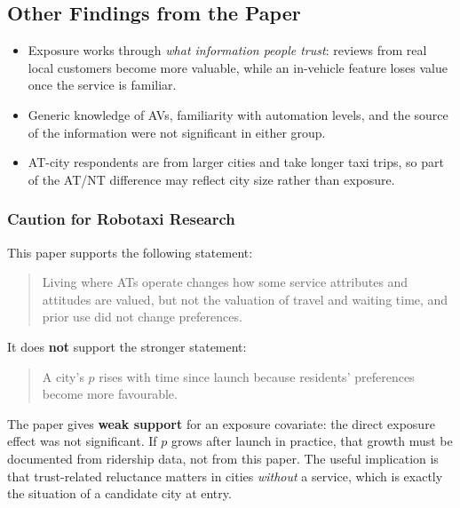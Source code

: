 \documentclass[10pt,a4paper]{article}
\providecommand{\tightlist}{\setlength{\itemsep}{0pt}\setlength{\parskip}{0pt}}
\begin{document}
\hypertarget{other-findings-from-the-paper-6}{%
\subsection{Other Findings from the Paper}\label{other-findings-from-the-paper-6}}

\begin{itemize}
\tightlist
\item
  Exposure works through \emph{what information people trust}: reviews from real local customers become more valuable, while an in-vehicle feature loses value once the service is familiar.
\item
  Generic knowledge of AVs, familiarity with automation levels, and the source of the information were not significant in either group.
\item
  AT-city respondents are from larger cities and take longer taxi trips, so part of the AT/NT difference may reflect city size rather than exposure.
\end{itemize}

\hypertarget{caution-for-robotaxi-research-6}{%
\subsubsection{Caution for Robotaxi Research}\label{caution-for-robotaxi-research-6}}

This paper supports the following statement:

\begin{quote}
Living where ATs operate changes how some service attributes and attitudes are valued, but not the valuation of travel and waiting time, and prior use did not change preferences.
\end{quote}

It does \textbf{not} support the stronger statement:

\begin{quote}
A city's $p$ rises with time since launch because residents' preferences become more favourable.
\end{quote}

The paper gives \textbf{weak support} for an exposure covariate: the direct exposure effect was not significant. If $p$ grows after launch in practice, that growth must be documented from ridership data, not from this paper. The useful implication is that trust-related reluctance matters in cities \emph{without} a service, which is exactly the situation of a candidate city at entry.
\end{document}

